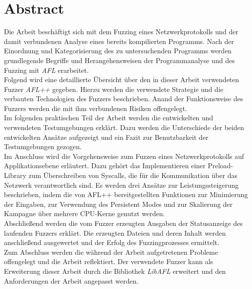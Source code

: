 
\clearpage
{}
\pagestyle{empty}
\section*{Abstract}
Die Arbeit \emph{\mytitle} beschäftigt sich mit dem Fuzzing eines Netzwerkprotokolls und der damit verbundenen
Analyse eines bereits kompilierten Programms.
Nach der Einordnung und Kategorisierung des zu untersuchenden Programms werden grundlegende Begriffe und Herangehensweisen
der Programmanalyse und des Fuzzing mit \emph{AFL} erarbeitet. \\
\linebreak
Folgend wird eine detaillierte Übersicht über den in dieser Arbeit verwendeten Fuzzer \emph{AFL++} gegeben.
Hierzu werden die verwendete Strategie und die verbauten Technologien des Fuzzers beschrieben.
Anand der Funktionsweise des Fuzzers werden die mit ihm verbundenen Risiken offengelegt. \\
\linebreak
Im folgenden praktischen Teil der Arbeit werden die entwickelten und verwendeten Testumgebungen erklärt.
Dazu werden die Unterschiede der beiden entwickelten Ansätze aufgezeigt und ein Fazit zur Benutzbarkeit der
Testumgebungen gezogen.\\
\linebreak
Im Anschluss wird die Vorgehensweise zum Fuzzen eines Netzwerkprotokolls auf Applikationsebene erläutert.
Dazu gehört das Implementieren einer Preload-Library zum Überschreiben von Syscalls, die für die Kommunikation
über das Netzwerk verantwortlich sind.
Es werden drei Ansätze zur Leistungssteigerung beschrieben, indem die
von AFL++ bereitgestellten Funktionen zur Minimierung der Eingaben, zur Verwendung des Persistent Modes und zur Skalierung
der Kampagne über mehrere CPU-Kerne genutzt werden.\\
\linebreak
Abschließend werden die vom Fuzzer erzeugten Ausgaben der Statusanzeige des laufenden Fuzzers erklärt.
Die erzeugten Dateien und deren Inhalt werden anschließend ausgewertet und der Erfolg des Fuzzingprozesses ermittelt. \\
\linebreak
Zum Abschluss werden die während der Arbeit aufgetretenen Probleme offengelegt und die Arbeit reflektiert.
Der verwendete Fuzzer kann als Erweiterung dieser Arbeit durch die Bibliothek \emph{LibAFL} erweitert und den Anforderungen
der Arbeit angepasst werden.

\restoregeometry